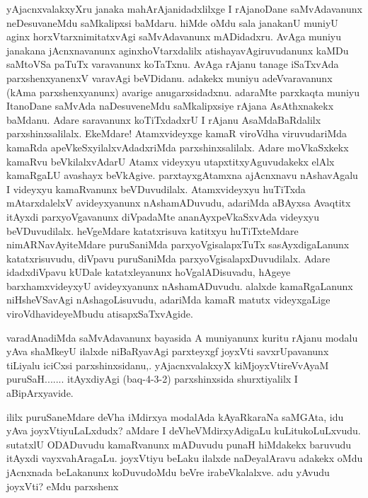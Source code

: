 
\begin{artha}
yAjacnxvalakxyXru janaka mahArAjanidadxlilxge I rAjanoDane saMvAdavanunx neDesuvaneMdu saMkalipxsi baMdaru. hiMde oMdu sala janakanU muniyU aginx horxVtarxnimitatxvAgi saMvAdavanunx mADidadxru. AvAga muniyu janakana jAcnxnavanunx aginxhoVtarxdalilx atishayavAgiruvudanunx kaMDu saMtoVSa paTuTx varavanunx koTaTxnu. AvAga rAjanu tanage iSaTxvAda parxshenxyanenxV varavAgi beVDidanu. adakekx muniyu adeVvaravanunx (kAma parxshenxyanunx) avarige anugarxsidadxnu. adaraMte parxkaqta muniyu ItanoDane saMvAda naDesuveneMdu saMkalipxsiye rAjana AsAthxnakekx baMdanu. Adare saravanunx koTiTxdadxrU I rAjanu AsaMdaBaRdalilx parxshinxsalilalx. EkeMdare! Atamxvideyxge kamaR viroVdha viruvudariMda kamaRda apeVkeSxyilalxvAdadxriMda parxshinxsalilalx. Adare moVkaSxkekx kamaRvu beVkilalxvAdarU Atamx videyxyu utapxtitxyAguvudakekx elAlx kamaRgaLU avashayx beVkAgive. parxtayxgAtamxna ajAcnxnavu nAshavAgalu I videyxyu kamaRvanunx beVDuvudilalx. Atamxvideyxyu huTiTxda mAtarxdalelxV avideyxyanunx nAshamADuvudu, adariMda aBAyxsa Avaqtitx itAyxdi parxyoVgavanunx diVpadaMte ananAyxpeVkaSxvAda videyxyu beVDuvudilalx. heVgeMdare katatxrisuva katitxyu huTiTxteMdare nimARNavAyiteMdare puruSaniMda parxyoVgisalapxTuTx sasAyxdigaLanunx katatxrisuvudu, diVpavu puruSaniMda parxyoVgisalapxDuvudilalx. Adare idadxdiVpavu kUDale katatxleyanunx hoVgalADisuvadu, hAgeye barxhamxvideyxyU avideyxyanunx nAshamADuvudu. alalxde kamaRgaLanunx niHsheVSavAgi nAshagoLisuvudu, adariMda kamaR matutx videyxgaLige viroVdhavideyeMbudu atisapxSaTxvAgide. 
\end{artha}%

\begin{artha}
varadAnadiMda saMvAdavanunx bayasida A muniyanunx kuritu rAjanu modalu yAva shaMkeyU ilalxde niBaRyavAgi parxteyxgf joyxVti savxrUpavanunx tiLiyalu iciCxsi parxshinxsidanu,. yAjacnxvalakxyX kiMjoyxVtireVvAyaM puruSaH.......  itAyxdiyAgi (baq-4-3-2) parxshinxsida shurxtiyalilx I aBipArxyavide.
\end{artha}


\begin{artha}
ililx puruSaneMdare deVha iMdirxya modalAda kAyaRkaraNa saMGAta, idu yAva joyxVtiyuLaLxdudx? aMdare I deVheVMdirxyAdigaLu kuLitukoLuLxvudu. sutatxlU ODADuvudu kamaRvanunx mADuvudu punaH hiMdakekx baruvudu itAyxdi vayxvahAragaLu. joyxVtiyu beLaku ilalxde naDeyalAravu adakekx oMdu jAcnxnada beLakanunx koDuvudoMdu beVre irabeVkalalxve. adu yAvudu joyxVti? eMdu parxshenx 
\end{artha}

